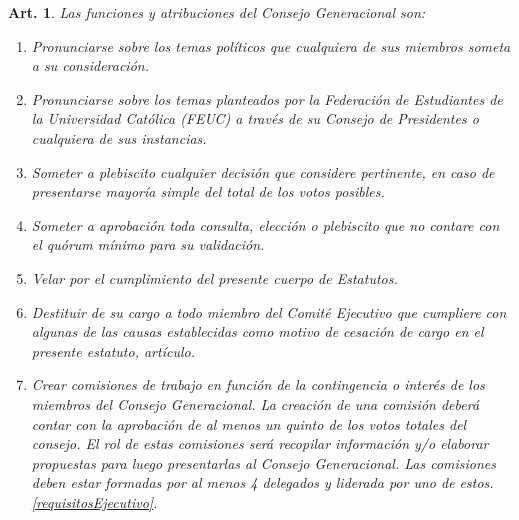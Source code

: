 \documentclass[letterpaper,11pt]{article}
\theoremstyle{plain}
\newtheorem{art}{Art.} %
\begin{document}
		\begin{art}\label{funcionesConsejoGeneracional}
			Las funciones y atribuciones del Consejo Generacional son:
			\begin{enumerate}
				\item Pronunciarse sobre los temas políticos que cualquiera de sus miembros someta a su consideración.
				\item Pronunciarse sobre los temas planteados por la Federación de Estudiantes de la Universidad Católica (FEUC) a través de su Consejo de Presidentes o cualquiera de sus instancias.
				\item Someter a plebiscito cualquier decisión que considere pertinente, en caso de presentarse mayoría simple del total de los votos posibles.
				\item Someter a aprobación toda consulta, elección o plebiscito que no contare con el quórum mínimo para su validación.
				\item Velar por el cumplimiento del presente cuerpo de Estatutos.
				\item Destituir de su cargo a todo miembro del Comité Ejecutivo que cumpliere con algunas de las causas establecidas como motivo de cesación de cargo en el presente estatuto, artículo.
				\item  Crear comisiones de trabajo en función de la contingencia o interés de los miembros del Consejo Generacional. La creación de una comisión deberá contar con la aprobación de al menos un quinto de los votos totales del consejo. El rol de estas comisiones será recopilar información y/o elaborar propuestas para luego presentarlas al Consejo Generacional. Las comisiones deben estar formadas por al menos 4 delegados y liderada por uno de estos. \ref{requisitosEjecutivo}.
			\end{enumerate}
		\end{art}
\end{document}
